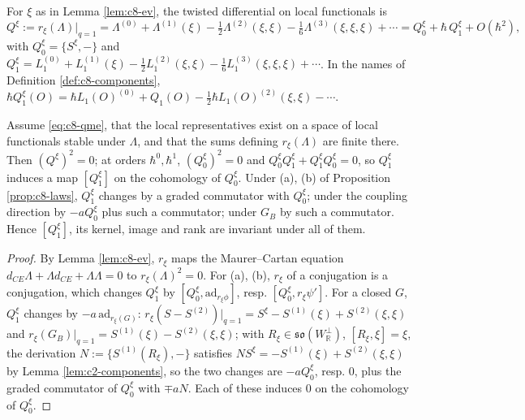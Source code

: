 \begin{definition}
\label{def:c8-twisted}
For $\xi$ as in Lemma \ref{lem:c8-ev}, the twisted differential on local functionals is
\[
Q^\xi:=r_\xi(\Lambda)\big|_{q=1}=\Lambda^{(0)}+\Lambda^{(1)}(\xi)-\tfrac12\Lambda^{(2)}(\xi,\xi)-\tfrac16\Lambda^{(3)}(\xi,\xi,\xi)+\cdots=Q^\xi_0+\hbar\,Q^\xi_1+O(\hbar^2),
\]
with $Q^\xi_0=\{S^\xi,-\}$ and $Q^\xi_1=L_1^{(0)}+L_1^{(1)}(\xi)-\tfrac12L_1^{(2)}(\xi,\xi)-\tfrac16L_1^{(3)}(\xi,\xi,\xi)+\cdots$. In the names of Definition \ref{def:c8-components}, $\hbar Q^\xi_1(O)=\hbar L_1(O)^{(0)}+Q_1(O)-\tfrac12\hbar L_1(O)^{(2)}(\xi,\xi)-\cdots$.
\end{definition}

\begin{theorem}
\label{thm:c8-twist}
Assume \eqref{eq:c8-qme}, that the local representatives exist on a space of local functionals stable under $\Lambda$, and that the sums defining $r_\xi(\Lambda)$ are finite there. Then $(Q^\xi)^2=0$; at orders $\hbar^0,\hbar^1$, $(Q^\xi_0)^2=0$ and $Q^\xi_0Q^\xi_1+Q^\xi_1Q^\xi_0=0$, so $Q^\xi_1$ induces a map $[Q^\xi_1]$ on the cohomology of $Q^\xi_0$. Under (a), (b) of Proposition \ref{prop:c8-laws}, $Q^\xi_1$ changes by a graded commutator with $Q^\xi_0$; under the coupling direction by $-aQ^\xi_0$ plus such a commutator; under $G_B$ by such a commutator. Hence $[Q^\xi_1]$, its kernel, image and rank are invariant under all of them.
\end{theorem}

\begin{proof}
By Lemma \ref{lem:c8-ev}, $r_\xi$ maps the Maurer--Cartan equation $d_{CE}\Lambda+\Lambda d_{CE}+\Lambda\Lambda=0$ to $r_\xi(\Lambda)^2=0$. For (a), (b), $r_\xi$ of a conjugation is a conjugation, which changes $Q^\xi_1$ by $[Q^\xi_0,\mathrm{ad}_{r_\xi\phi}]$, resp. $[Q^\xi_0,r_\xi\psi']$. For a closed $G$, $Q^\xi_1$ changes by $-a\,\mathrm{ad}_{r_\xi(G)}$: $r_\xi(S-S^{(2)})|_{q=1}=S^\xi-S^{(1)}(\xi)+S^{(2)}(\xi,\xi)$ and $r_\xi(G_B)|_{q=1}=S^{(1)}(\xi)-S^{(2)}(\xi,\xi)$; with $R_\xi\in\mathfrak{so}(W_{\mathbb R}^\perp)$, $[R_\xi,\xi]=\xi$, the derivation $N:=\{S^{(1)}(R_\xi),-\}$ satisfies $NS^\xi=-S^{(1)}(\xi)+S^{(2)}(\xi,\xi)$ by Lemma \ref{lem:c2-components}, so the two changes are $-aQ^\xi_0$, resp. $0$, plus the graded commutator of $Q^\xi_0$ with $\mp aN$. Each of these induces $0$ on the cohomology of $Q^\xi_0$.
\end{proof}

